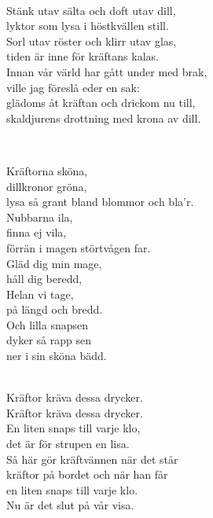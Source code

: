 
 \\       

\songtext{} 
Stänk utav sälta och doft utav dill,\\
lyktor som lysa i höstkvällen still.\\
Sorl utav röster och klirr utav glas,\\
tiden är inne för kräftans kalas.\\
Innan vår värld har gått under med brak,\\
ville jag föreslå eder en sak:\\
glädoms åt kräftan och drickom nu till,\\
skaldjurens drottning med krona av dill.\\

\newpage


 \\

\songtext{} 
Kräftorna sköna,\\
dillkronor gröna,\\
lysa så grant bland blommor och bla'r.\\
Nubbarna ila,\\
finna ej vila,\\
förrän i magen störtvågen far.\\
Gläd dig min mage,\\
håll dig beredd,\\
Helan vi tage,\\
på längd och bredd.\\
Och lilla snapsen\\
dyker så rapp sen\\
ner i sin sköna bädd.\\


 \\       

\songtext{} 
Kräftor kräva dessa drycker.\\
Kräftor kräva dessa drycker.\\
En liten snaps till varje klo,\\
det är för strupen en lisa.\\
Så här gör kräftvännen när det står\\
kräftor på bordet och när han får\\
en liten snaps till varje klo.\\
Nu är det slut på vår visa.

